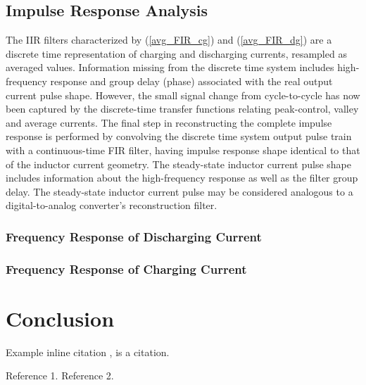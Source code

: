 \documentclass[conference]{IEEEtran}
\begin{document}
\subsection{Impulse Response Analysis}
The IIR filters characterized by (\ref{avg_FIR_cg}) and (\ref{avg_FIR_dg}) are a discrete time representation of charging and discharging currents, resampled as averaged values.  Information missing from the discrete time system includes high-frequency response and group delay (phase) associated with the real output current pulse shape. However, the small signal change from cycle-to-cycle has now been captured by the discrete-time transfer functions relating peak-control, valley and average currents. The final step in reconstructing the complete impulse response is performed by convolving the discrete time system output pulse train with a continuous-time FIR filter, having impulse response shape identical to that of the inductor current geometry.  The steady-state inductor current pulse shape includes information about the high-frequency response as well as the filter group delay.  The steady-state inductor current pulse may be considered analogous to a digital-to-analog converter's reconstruction filter. 

\subsubsection{Frequency Response of Discharging Current}

\subsubsection{Frequency Response of Charging Current}

\section{Conclusion}

Example inline citation
\cite{b1}, is a citation.


\begin{thebibliography}{00}
 Reference 1.
 Reference 2.
\end{thebibliography}
\end{document}
